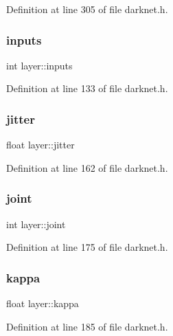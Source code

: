 Definition at line 305 of file darknet.\+h.

\mbox{\label{structlayer_a3fac583bf31e18ca679d195b1485b316}} 
\subsubsection{\texorpdfstring{inputs}{inputs}}
{\footnotesize\ttfamily int layer\+::inputs}



Definition at line 133 of file darknet.\+h.

\mbox{\label{structlayer_a5a580dce2dc1716ff9fe8524da2f4237}} 
\subsubsection{\texorpdfstring{jitter}{jitter}}
{\footnotesize\ttfamily float layer\+::jitter}



Definition at line 162 of file darknet.\+h.

\mbox{\label{structlayer_aac680bb3fa86a374a0252fff77bb887d}} 
\subsubsection{\texorpdfstring{joint}{joint}}
{\footnotesize\ttfamily int layer\+::joint}



Definition at line 175 of file darknet.\+h.

\mbox{\label{structlayer_ac8ee04d5346e8f3d682ebc02e8a6b663}} 
\subsubsection{\texorpdfstring{kappa}{kappa}}
{\footnotesize\ttfamily float layer\+::kappa}



Definition at line 185 of file darknet.\+h.

\mbox{\label{structlayer_a329f298275a866fae317080159336d98}} 
